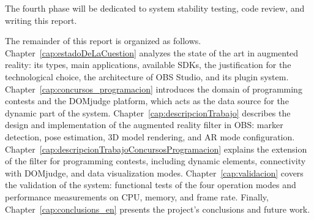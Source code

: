 The fourth phase will be dedicated to system stability testing, code review, and writing this report.

The remainder of this report is organized as follows. Chapter~\ref{cap:estadoDeLaCuestion} analyzes the state of the art in augmented reality: its types, main applications, available SDKs, the justification for the technological choice, the architecture of OBS Studio, and its plugin system. Chapter~\ref{cap:concursos_programacion} introduces the domain of programming contests and the DOMjudge platform, which acts as the data source for the dynamic part of the system. Chapter~\ref{cap:descripcionTrabajo} describes the design and implementation of the augmented reality filter in OBS: marker detection, pose estimation, 3D model rendering, and AR mode configuration. Chapter~\ref{cap:descripcionTrabajoConcursosProgramacion} explains the extension of the filter for programming contests, including dynamic elements, connectivity with DOMjudge, and data visualization modes. Chapter~\ref{cap:validacion} covers the validation of the system: functional tests of the four operation modes and performance measurements on CPU, memory, and frame rate. Finally, Chapter~\ref{cap:conclusions_en} presents the project's conclusions and future work.
